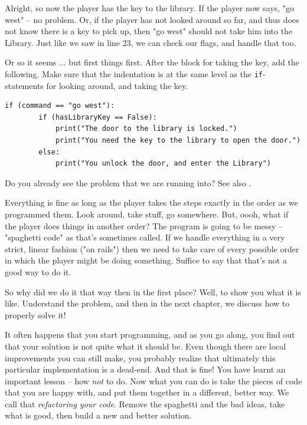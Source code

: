 Alright, so now the player has the key to the library. If the player now says, "go west" -- no problem. Or, if the player has not looked around so far, and thus does not know there is a key to pick up, then "go west" should not take him into the Library. Just like we saw in line 23, we can check our flags, and handle that too. 

Or so it seems ... but first things first. After the block for taking the key, add the following. Make sure that the indentation is at the same level as the \texttt{if}-statements for looking around, and taking the key. 

\begin{lstlisting}[firstnumber=last]
if (command == "go west"):
        if (hasLibraryKey == False):
            print("The door to the library is locked.")
            print("You need the key to the library to open the door.")
        else:
            print("You unlock the door, and enter the Library")
\end{lstlisting}

\begin{Exe}
Do you already see the problem that we are running into? See also . \expend
\end{Exe}

Everything is fine as long as the player takes the steps exactly in the order as we programmed them. Look around, take stuff, go somewhere. But, oooh, what if the player does things in another order? The program is going to be messy -- "spaghetti code" as that's sometimes called. If we handle everything in a very strict, linear fashion ("on rails") then we need to take care of every possible order in which the player might be doing something. Suffice to say that that's not a good way to do it. 

So why did we do it that way then in the first place? Well, to show you what it is like. Understand the problem, and then in the next chapter, we discuss how to properly solve it!

\begin{Exp}[Refactoring] 
It often happens that you start programming, and as you go along, you find out that your solution is not quite what it should be. Even though there are local improvements you can still make, you probably realize that ultimately this particular implementation is a dead-end. And that is fine! You have learnt an important lesson -- how \emph{not} to do. Now what you can do is take the pieces of code that you are happy with, and put them together in a different, better way. We call that \emph{refactoring your code}. Remove the spaghetti and the bad ideas, take what is good, then build a new and better solution. \expend    
\end{Exp} 


